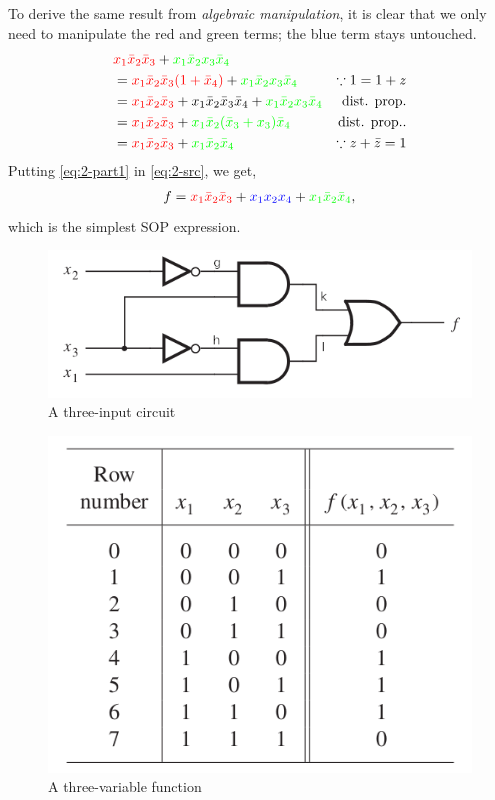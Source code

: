 \documentclass[twocolumn]{article}
\newcommand{\bx}{\bar{x}}
\newcommand{\bz}{\bar{z}}
\begin{document}
To derive the same result from \emph{algebraic manipulation}, it is clear that
we only need to manipulate the red and green terms; the blue term stays untouched.
%
\begin{align}
& {\color{red}x_1\bx_2\bx_3} +  {\color{green}x_1\bx_2x_3\bx_4} &
  \notag\\
  &= {\color{red}x_1\bx_2\bx_3 (1 + \bx_4)} +  {\color{green}x_1\bx_2x_3\bx_4} & \because 1 = 1 + z
  \notag\\
  &= {\color{red}x_1\bx_2\bx_3 } + x_1\bx_2\bx_3\bx_4 + {\color{green}x_1\bx_2x_3\bx_4} & \text{dist. prop.}
  \notag\\
  &= {\color{red}x_1\bx_2\bx_3 } + {\color{green}x_1\bx_2(\bx_3 + x_3)\bx_4 } & \text{dist. prop.}.
  \notag\\
  &= {\color{red}x_1\bx_2\bx_3 } + {\color{green}x_1\bx_2\bx_4 } & \because z + \bz = 1
                                                                   \label{eq:2-part1}
\end{align}
%
Putting \eqref{eq:2-part1} in \eqref{eq:2-src}, we get,
%
\begin{align}
  f = {\color{red}x_1\bx_2\bx_3} + {\color{blue}x_1x_2x_4} + {\color{green}x_1\bx_2\bx_4},
\end{align}
%
which is the simplest SOP expression.
  

\begin{figure}
\centering
\includegraphics[width=\linewidth]{fig-2.24a.png}
\caption{A three-input circuit}
\label{fig:fig-2.24a}
\end{figure}

\begin{figure}
    \centering
    \includegraphics[width=\linewidth]{fig-2.23.png}
    \caption{A three-variable function}
    \label{fig:fig-2.23}
\end{figure}
\end{document}
